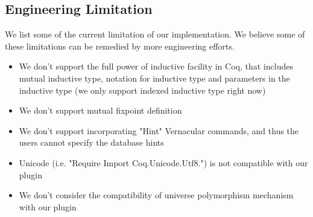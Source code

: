 



\subsection{Engineering Limitation}
We list some of the current limitation of our implementation. We believe some of these limitations can be remedied by more engineering efforts.
\begin{itemize}
  \item We don't support the full power of inductive facility in Coq, that includes mutual inductive type, notation for inductive type and parameters in the inductive type (we only support indexed inductive type right now)
  \item We don't support mutual fixpoint definition
  \item We don't support incorporating "Hint" Vernacular commands, and thus the users cannot specify the database hints
  \item Unicode (i.e. "Require Import Coq.Unicode.Utf8.") is not compatible with our plugin 
  \item We don't consider the compatibility of universe polymorphism mechanism with our plugin
\end{itemize}
